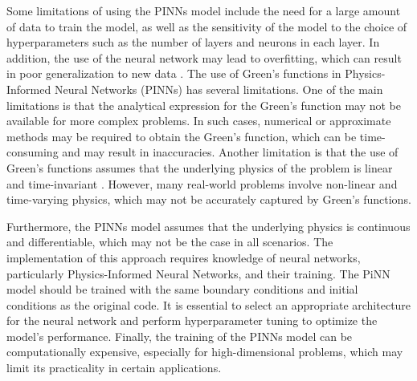 Some limitations of using the PINNs model include the need for a large amount of data to train the model, as well as the sensitivity of the model to the choice of hyperparameters such as the number of layers and neurons in each layer. In addition, the use of the neural network may lead to overfitting, which can result in poor generalization to new data \cite{Hassan2017}. The use of Green's functions in Physics-Informed Neural Networks (PINNs) has several limitations. One of the main limitations is that the analytical expression for the Green's function may not be available for more complex problems. In such cases, numerical or approximate methods may be required to obtain the Green's function, which can be time-consuming and may result in inaccuracies. Another limitation is that the use of Green's functions assumes that the underlying physics of the problem is linear and time-invariant \cite{Skinner}. However, many real-world problems involve non-linear and time-varying physics, which may not be accurately captured by Green's functions.


Furthermore, the PINNs model assumes that the underlying physics is continuous and differentiable, which may not be the case in all scenarios. The implementation of this approach requires knowledge of neural networks, particularly Physics-Informed Neural Networks, and their training. The PiNN model should be trained with the same boundary conditions and initial conditions as the original code. It is essential to select an appropriate architecture for the neural network and perform hyperparameter tuning to optimize the model's performance. Finally, the training of the PINNs model can be computationally expensive, especially for high-dimensional problems, which may limit its practicality in certain applications.